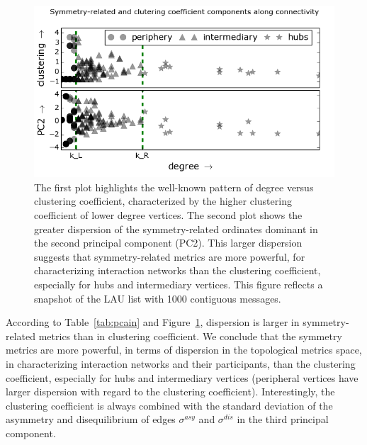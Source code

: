 \begin{figure} 
\centering
\includegraphics[width=.45\textwidth]{figs/im13PCAPLOT__}
\caption{The first plot highlights the well-known pattern of degree versus clustering coefficient, characterized by the higher clustering coefficient of lower degree vertices.
    The second plot shows the greater dispersion of the symmetry-related ordinates dominant in the second principal component (PC2).
This larger dispersion suggests that symmetry-related metrics are more powerful,
for characterizing interaction networks than the clustering coefficient,
especially for hubs and intermediary vertices.
This figure reflects a snapshot of the LAU list with 1000 contiguous messages.}

\label{fig:sym}
\end{figure}

According to Table~\ref{tab:pcain} and Figure~\ref{fig:sym},
dispersion is larger in symmetry-related metrics than in clustering coefficient.
We conclude that the symmetry metrics are more powerful, in terms of dispersion in the topological metrics space, in characterizing interaction networks and their participants, than the clustering coefficient, especially for hubs and intermediary vertices (peripheral vertices have larger dispersion with regard to the clustering coefficient).
Interestingly, the clustering coefficient is always combined
with the standard deviation of the asymmetry and disequilibrium
of edges $\sigma^{asy}$ and $\sigma^{dis}$ in the third principal component.

